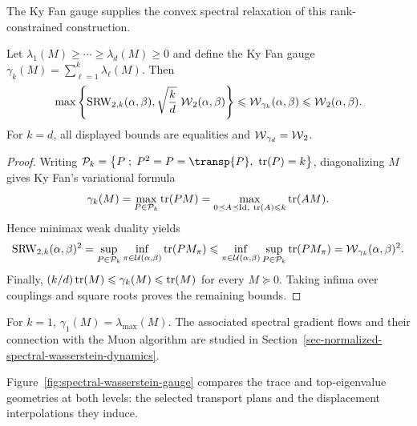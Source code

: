 The Ky Fan gauge supplies the convex spectral relaxation of this rank-constrained construction.

\begin{prop}\label{prop-ky-fan-srw-comparison}
	Let $\lambda_1(M)\geq\cdots\geq\lambda_d(M)\geq0$ and define the Ky Fan gauge $\gamma_k(M)=\sum_{\ell=1}^k\lambda_\ell(M)$. Then
	\[
		\max\left\{\operatorname{SRW}_{2,k}(\alpha,\beta),\sqrt{\frac{k}{d}}\,\operatorname{\mathcal{W}}_2(\alpha,\beta)\right\}
		\leqslant
		\operatorname{\mathcal{W}}_{\gamma_k}(\alpha,\beta)
		\leqslant
		\operatorname{\mathcal{W}}_2(\alpha,\beta).
	\]
	For $k=d$, all displayed bounds are equalities and $\operatorname{\mathcal{W}}_{\gamma_d}=\operatorname{\mathcal{W}}_2$.
\end{prop}
\begin{proof}
	Writing $\mathcal P_k=\enscond{P}{P^2=P=\transp{P},\ \tr(P)=k}$, diagonalizing $M$ gives Ky Fan's variational formula
	\[
		\gamma_k(M)
		=
		\max_{P\in\mathcal P_k}\operatorname{tr}(PM)
		=
		\max_{0\preceq A\preceq\mathrm{Id},\ \operatorname{tr}(A)\leqslant k}\operatorname{tr}(AM).
	\]
	Hence minimax weak duality yields
	\[
		\operatorname{SRW}_{2,k}(\alpha,\beta)^2
		=
		\sup_{P\in\mathcal P_k}\inf_{\pi\in\mathcal{U}(\alpha,\beta)}\operatorname{tr}(PM_\pi)
		\leqslant
		\inf_{\pi\in\mathcal{U}(\alpha,\beta)}\sup_{P\in\mathcal P_k}\operatorname{tr}(PM_\pi)
		=
		\operatorname{\mathcal{W}}_{\gamma_k}(\alpha,\beta)^2.
	\]
	Finally, $(k/d)\operatorname{tr}(M)\leqslant\gamma_k(M)\leqslant\operatorname{tr}(M)$ for every $M\succeq0$. Taking infima over couplings and square roots proves the remaining bounds.
\end{proof}

For $k=1$, $\gamma_1(M)=\lambda_{\max}(M)$. The associated spectral gradient flows and their connection with the Muon algorithm are studied in Section~\ref{sec-normalized-spectral-wasserstein-dynamics}.

Figure~\ref{fig:spectral-wasserstein-gauge} compares the trace and top-eigenvalue geometries at both levels: the selected transport plans and the displacement interpolations they induce.

